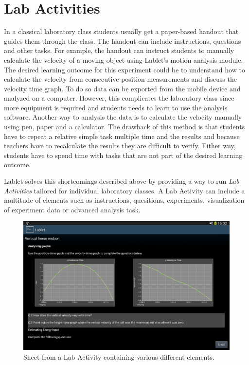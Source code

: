 \documentclass{sigchi}
\begin{document}
\section{Lab Activities}
In a classical laboratory class students usually get a paper-based
handout that guides them through the class.  The handout can include
instructions, questions and other tasks.  For example, the handout can
instruct students to manually calculate the velocity of a moving
object using Lablet's motion analysis module.  The desired learning
outcome for this experiment could be to understand how to calculate
the velocity from consecutive position measurements and discuss the
velocity time graph.  To do so data can be exported from the mobile
device and analyzed on a computer.  However, this complicates the
laboratory class since more equipment is required and students needs
to learn to use the analysis software.  Another way to analysis the
data is to calculate the velocity manually using pen, paper and a
calculator.  The drawback of this method is that students have to
repeat a relative simple task multiple time and the results and
because teachers have to recalculate the results they are difficult to
verify.  Either way, students have to spend time with tasks that are
not part of the desired learning outcome.

Lablet solves this shortcomings described above by providing a way to
run {\em Lab Activities} tailored for individual laboratory classes.
A Lab Activity can include a multitude of elements such as
instructions, quesitions, experiments, visualization of experiment
data or advanced analysis task.

\begin{figure}
  \centering
  \includegraphics[width=.99\columnwidth]{LabActivitySheet}
  \caption{Sheet from a Lab Activity containing various different
    elements.}
  \label{fig:LabActivitySheet} 
\end{figure}
\end{document}
